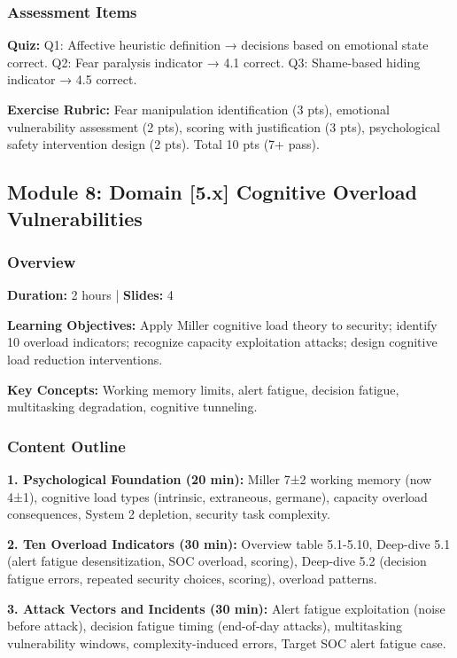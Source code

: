 \documentclass[11pt,a4paper]{article}
\begin{document}
\subsubsection{Assessment Items}
\textbf{Quiz:} Q1: Affective heuristic definition → decisions based on emotional state correct. Q2: Fear paralysis indicator → 4.1 correct. Q3: Shame-based hiding indicator → 4.5 correct.

\textbf{Exercise Rubric:} Fear manipulation identification (3 pts), emotional vulnerability assessment (2 pts), scoring with justification (3 pts), psychological safety intervention design (2 pts). Total 10 pts (7+ pass).

\subsection{Module 8: Domain [5.x] Cognitive Overload Vulnerabilities}

\subsubsection{Overview}
\textbf{Duration:} 2 hours | \textbf{Slides:} 4

\textbf{Learning Objectives:} Apply Miller cognitive load theory to security; identify 10 overload indicators; recognize capacity exploitation attacks; design cognitive load reduction interventions.

\textbf{Key Concepts:} Working memory limits, alert fatigue, decision fatigue, multitasking degradation, cognitive tunneling.

\subsubsection{Content Outline}
\textbf{1. Psychological Foundation (20 min):} Miller 7±2 working memory (now 4±1), cognitive load types (intrinsic, extraneous, germane), capacity overload consequences, System 2 depletion, security task complexity.

\textbf{2. Ten Overload Indicators (30 min):} Overview table 5.1-5.10, Deep-dive 5.1 (alert fatigue desensitization, SOC overload, scoring), Deep-dive 5.2 (decision fatigue errors, repeated security choices, scoring), overload patterns.

\textbf{3. Attack Vectors and Incidents (30 min):} Alert fatigue exploitation (noise before attack), decision fatigue timing (end-of-day attacks), multitasking vulnerability windows, complexity-induced errors, Target SOC alert fatigue case.
\end{document}
